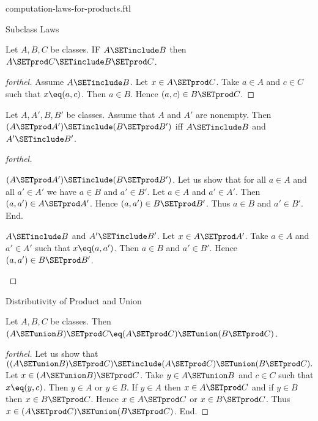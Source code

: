 \documentclass{naproche-library}
\begin{document}
\begin{smodule}[title=Computation Laws for Cartesian Products]{computation-laws-for-products.ftl}

\begin{sfragment}{Subclass Laws}
  \begin{proposition}[forthel,id=FOUNDATIONS_05_5719644021194752]
    Let $A, B, C$ be classes.
    IF $A \SETinclude B$ then $A \SETprod C \SETinclude B \SETprod C$.
  \end{proposition}
  \begin{proof}[forthel]
    Assume $A \SETinclude B$.
    Let $x \in A \SETprod C$.
    Take $a \in A$ and $c \in C$ such that $x \eq (a, c)$.
    Then $a \in B$.
    Hence $(a, c) \in B \SETprod C$.
  \end{proof}

  \begin{proposition}[forthel,id=FOUNDATIONS_05_4888282951319552]
    Let $A, A', B, B'$ be classes.
    Assume that $A$ and $A'$ are nonempty.
    Then $(A \SETprod A') \SETinclude (B \SETprod B')$ iff $A \SETinclude B$ and $A' \SETinclude B'$.
  \end{proposition}
  \begin{proof}[forthel]
    \begin{case}{$(A \SETprod A') \SETinclude (B \SETprod B')$.}
      Let us show that for all $a \in A$ and all $a' \in A'$ we have $a \in B$ and $a' \in B'$.
        Let $a \in A$ and $a' \in A'$.
        Then $(a, a') \in A \SETprod A'$.
        Hence $(a, a') \in B \SETprod B'$.
        Thus $a \in B$ and $a' \in B'$.
      End.
    \end{case}

    \begin{case}{$A \SETinclude B$ and $A' \SETinclude B'$.}
      Let $x \in A \SETprod A'$.
      Take $a \in A$ and $a' \in A'$ such that $x \eq (a, a')$.
      Then $a \in B$ and $a' \in B'$.
      Hence $(a, a') \in B \SETprod B'$.
    \end{case}
  \end{proof}
\end{sfragment}

\begin{sfragment}{Distributivity of Product and Union}
  \begin{proposition}[forthel,id=FOUNDATIONS_05_8849658323402752]
    Let $A, B, C$ be classes.
    Then $(A \SETunion B) \SETprod C \eq (A \SETprod C) \SETunion (B \SETprod C)$.
  \end{proposition}
  \begin{proof}[forthel]
    Let us show that $((A \SETunion B) \SETprod C) \SETinclude (A \SETprod C) \SETunion (B \SETprod C).$ %
      Let $x \in (A \SETunion B) \SETprod C$.
      Take $y \in A \SETunion B$ and $c \in C$ such that $x \eq (y, c)$.
      Then $y \in A$ or $y \in B$.
      If $y \in A$ then $x \in A \SETprod C$ and if $y \in B$ then $x \in B \SETprod C$.
      Hence $x \in A \SETprod C$ or $x \in B \SETprod C$.
      Thus $x \in (A \SETprod C) \SETunion (B \SETprod C)$.
    End.


\end{proof}
\end{sfragment}
\end{smodule}
\end{document}
